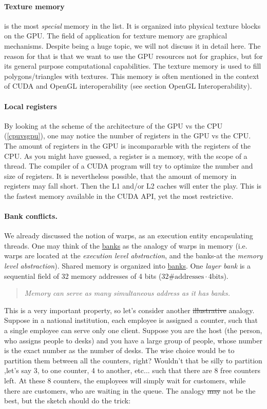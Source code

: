 \paragraph{Texture memory} is the most \textit{special} memory in the list. It is organized into physical 
texture blocks on the GPU. The field of application for texture memory are graphical mechanisms. Despite being a huge topic, we will not discuss 
it in detail here. The reason for that is that we want to use the GPU resources not for graphics, but for its general purpose computational capabilities. The texture memory is used to fill polygons/triangles with textures. This memory 
is often mentioned in the context of CUDA and OpenGL interoperability (see \cite{center} section OpenGL Interoperability).

\paragraph{Local registers}
By looking at the scheme of the architecture of the GPU vs the CPU (\autoref{cpuvsgpu}), one may notice the number 
of registers in the GPU vs the CPU. The amount of registers in the GPU
is incompararble with the registers of the CPU. As you might have guessed, a 
register is a memory, with the scope of a thread. The compiler of a CUDA program will try to optimize the number and size of registers. 
It is nevertheless possible, that the amount of memory in registers may fall short. Then the L1 and/or L2 caches will enter the 
play. This is the fastest memory available in the CUDA API, yet the most restrictive.

\paragraph{Bank conflicts.}We already discussed the notion of warps, as an execution entity encapsulating threads. 
One may think of the \underline{banks} as the analogy of warps in memory
 (i.e. warps are located at the \textit{execution level abstraction}, and the 
 banks-at the \textit{memory level abstraction}). 
 Shared memory is organized into \underline{banks}.
One \textit{layer bank} is a sequential field of 32 memory addresses of 4 bits ($32\text{\#addresses}\cdot 4\text{bits}$). 

\begin{quote}
   \textsl{Memory can serve as many simultaneous address as it has banks.} 
\end{quote}
This is a very important property, so let's consider another \sout{illustrative} analogy. Suppose in a national institution, 
each employee 
is assigned a counter, such that a single employee can serve only one client. Suppose you are the host 
(the person, who assigns people to desks)
and you have a large group of people, whose number is the exact number as the number of desks. The wise choice would be to 
partition them between all the counters, right? Wouldn't that be silly to partition ,let's say 3, to one counter, 4 to 
another, etc... such that there are 8 free counters left. At these 8 counters, the employees will simply wait 
for customers, while there are customers, who are waiting in the queue.
The analogy \sout{may} not be the best, but the sketch should do the trick: 

